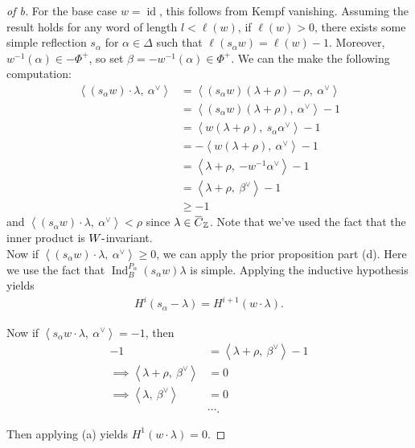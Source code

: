 \begin{proof}[of b]

For the base case \(w=\operatorname{id}\), this follows from Kempf
vanishing. Assuming the result holds for any word of length
\(l<\ell(w)\), if \(\ell(w) > 0\), there exists some simple reflection
\(s_\alpha\) for \(\alpha\in\Delta\) such that
\(\ell(s_\alpha w) = \ell(w) - 1\). Moreover,
\(w^{-1}(\alpha) \in -\Phi^+\), so set
\(\beta = -w^{-1}(\alpha) \in \Phi^+\). We can the make the following
computation:
\begin{align*}  
{\left\langle {(s_\alpha w) \cdot \lambda},~{\alpha^\vee} \right\rangle}
&= {\left\langle {(s_\alpha w)(\lambda+\rho) - \rho},~{\alpha^\vee} \right\rangle}  \\
&= {\left\langle {(s_\alpha w)(\lambda+\rho)},~{\alpha^\vee} \right\rangle} - 1 \\
&= {\left\langle {w(\lambda+\rho)},~{s_\alpha \alpha^\vee} \right\rangle} - 1 \\
&= - {\left\langle {w(\lambda+\rho)},~{\alpha^\vee} \right\rangle} - 1  \\
&= {\left\langle {\lambda + \rho},~{-w^{-1}\alpha^\vee} \right\rangle} - 1 \\
&= {\left\langle {\lambda + \rho},~{\beta^\vee} \right\rangle} - 1 \\
&\geq -1
\end{align*}
and
\({\left\langle {(s_\alpha w)\cdot \lambda},~{ \alpha^\vee} \right\rangle} < \rho\)
since
\(\lambda\in \mkern 1.5mu\overline{\mkern-1.5muC\mkern-1.5mu}\mkern 1.5mu_{\mathbb{Z}}\).
Note that we've used the fact that the inner product is
\(W{\hbox{-}}\)invariant.\\

Now if
\({\left\langle {(s_\alpha w)\cdot \lambda},~{ \alpha^\vee} \right\rangle} \geq 0\),
we can apply the prior proposition part (d). Here we use the fact that
\(\operatorname{Ind}_B^{P_\alpha}(s_\alpha w)\lambda\) is simple.
Applying the inductive hypothesis yields
\begin{align*}  
H^i(s_\alpha - \lambda) = H^{i+1}(w\cdot \lambda)
.\end{align*}

Now if
\({\left\langle {s_\alpha w \cdot \lambda},~{\alpha^\vee} \right\rangle} = -1\),
then
\begin{align*}  
-1 &= {\left\langle {\lambda + \rho},~{\beta^\vee} \right\rangle} - 1 \\
\implies {\left\langle {\lambda + \rho},~{\beta^\vee} \right\rangle} &= 0 \\
\implies {\left\langle {\lambda},~{\beta^\vee} \right\rangle} &= 0 \\
& \cdots
.\end{align*}


Then applying (a) yields \(H^1(w\cdot \lambda) = 0\).

\end{proof}

